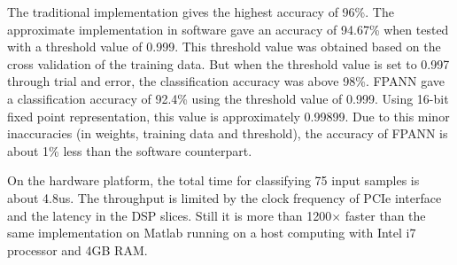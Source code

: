 The traditional implementation gives the highest accuracy of 96\%.
The approximate implementation in software gave an accuracy of 94.67\% when tested with a threshold value of 0.999.
This threshold value was obtained based on the cross validation of the training data.
But when the threshold value is set to 0.997 through trial and error, the classification accuracy was above 98\%.
FPANN gave a classification accuracy of 92.4\% using the threshold value of 0.999.
Using 16-bit fixed point representation, this value is approximately 0.99899.
Due to this minor inaccuracies (in weights, training data and threshold), the accuracy of FPANN is about 1\% less than the software counterpart.

On the hardware platform, the total time for classifying 75 input samples is about 4.8us.
The throughput is limited by the clock frequency of PCIe interface and the latency in the DSP slices.
Still it is more than 1200$\times$ faster than the same implementation on Matlab running on a host computing with Intel i7 processor and 4GB RAM. 
